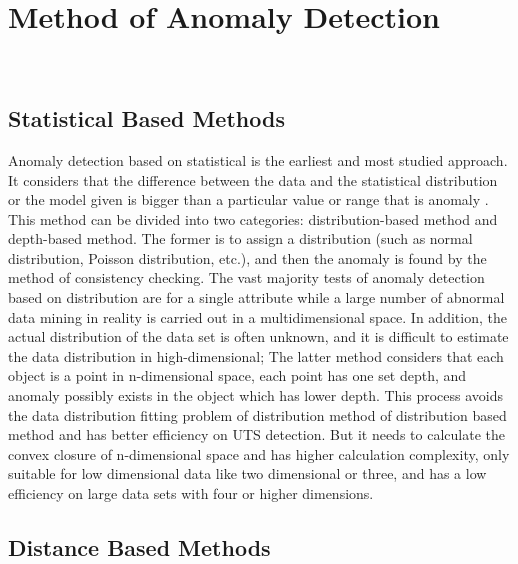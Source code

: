 \section{Method of Anomaly Detection}~\label{sec-method}
\subsection{Statistical Based Methods}
Anomaly detection based on statistical is the earliest and
most studied approach.
It considers that the difference
between the data and the statistical distribution or the model
given is bigger than a particular value or range that is
anomaly .
This method can be divided into two
categories: distribution-based method and depth-based
method.
The former is to assign a distribution (such as
normal distribution,
Poisson distribution,
etc.),
and then the anomaly is found by the method of consistency checking.
The vast majority tests of anomaly detection based on
distribution are for a single attribute while a large number
of abnormal data mining in reality is carried out in a
multidimensional space.
In addition,
the actual distribution
of the data set is often unknown,
and it is difficult to
estimate the data distribution in high-dimensional; The
latter method considers that each object is a point in
n-dimensional space,
each point has one set depth,
and anomaly possibly exists in the object which has lower depth.
This process avoids the data distribution fitting problem of
distribution method of distribution based method and has
better efficiency on UTS detection.
But it needs to calculate
the convex closure of n-dimensional space and has higher
calculation complexity,
only suitable for low dimensional
data like two dimensional or three,
and has a low efficiency
on large data sets with four or higher dimensions.

\subsection{Distance Based Methods}

